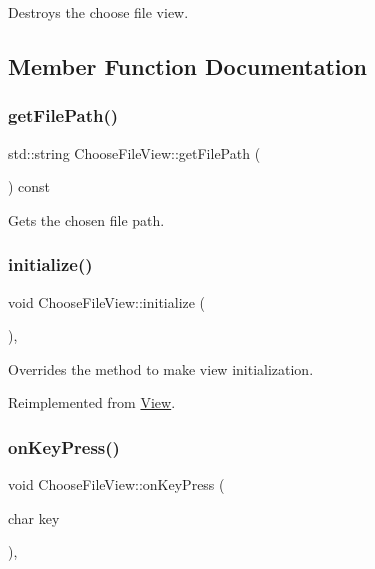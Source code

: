 Destroys the choose file view. 



\subsection{Member Function Documentation}
\mbox{\label{class_choose_file_view_a13417add6f5b093f225fcb9aabe15545}} 
\subsubsection{\texorpdfstring{getFilePath()}{getFilePath()}}
{\footnotesize\ttfamily std\+::string Choose\+File\+View\+::get\+File\+Path (\begin{DoxyParamCaption}{ }\end{DoxyParamCaption}) const}



Gets the chosen file path. 

\mbox{\label{class_choose_file_view_a16e0c6bdcb247f7b792934c4d7901db5}} 
\subsubsection{\texorpdfstring{initialize()}{initialize()}}
{\footnotesize\ttfamily void Choose\+File\+View\+::initialize (\begin{DoxyParamCaption}{ }\end{DoxyParamCaption})\hspace{0.3cm}{\ttfamily [override]}, {\ttfamily [virtual]}}



Overrides the method to make view initialization. 



Reimplemented from \mbox{\hyperlink{class_view_a334fa9a19d2faca0120ef2869c3dd8ad}{View}}.

\mbox{\label{class_choose_file_view_a011a3bf65dfc4b5e02327760ab8370ea}} 
\subsubsection{\texorpdfstring{onKeyPress()}{onKeyPress()}}
{\footnotesize\ttfamily void Choose\+File\+View\+::on\+Key\+Press (\begin{DoxyParamCaption}\item[{char}]{key }\end{DoxyParamCaption})\hspace{0.3cm}{\ttfamily [override]}, {\ttfamily [virtual]}}



